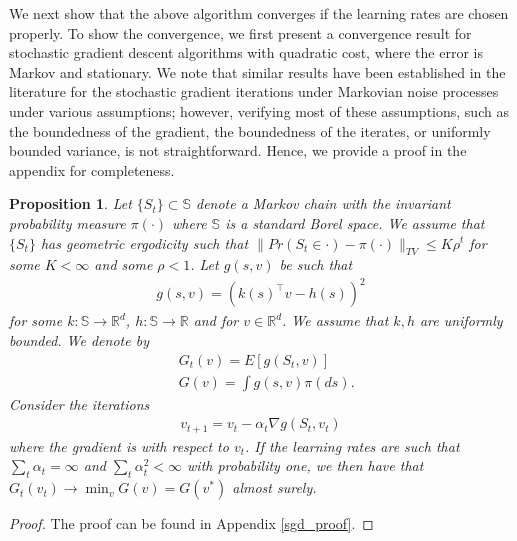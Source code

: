 \documentclass[twoside,11pt]{article}
\newtheorem{prop}{Proposition}[section]
\begin{document}
We next show that the above algorithm converges if the learning rates are chosen properly. To show the convergence, we first present a convergence result for stochastic gradient descent algorithms with quadratic cost, where the error is Markov and stationary.  We note that similar results have been established in the literature for the stochastic gradient iterations under Markovian noise processes under various assumptions; however, verifying most of these assumptions, such as the boundedness of the gradient, the boundedness of the iterates, or uniformly bounded variance, is not straightforward. Hence, we provide a proof in the appendix for completeness.
\begin{prop}\label{sgd} 
Let $\{S_t\} \subset \mathds{S}$ denote a Markov chain with the invariant probability measure $\pi(\cdot)$ where $\mathds{S}$ is a standard Borel space.  We assume that $\{S_t\}$ has geometric ergodicity such that $\|Pr(S_t\in\cdot) - \pi(\cdot)\|_{TV}\leq K\rho^t$ for some $K<\infty$ and some $\rho<1$.  Let $g(s,v)$ be  such that 
\begin{align*}
g(s,v) = \left( k(s)^\intercal v - h(s)  \right)^2
\end{align*}
for some $k:\mathds{S}\to \mathds{R}^d$, $h:\mathds{S}\to \mathds{R}$  and for $v\in\mathds{R}^d$. We assume that $k,h$ are uniformly bounded.  We denote by 
\begin{align*}
&G_t(v)= E[g(S_t,v)]\\
&G(v) = \int g(s,v) \pi(ds).
\end{align*}
Consider the iterations
\begin{align*}
v_{t+1} = v_t - \alpha_t \nabla g(S_t,v_t)
\end{align*}
where the gradient is with respect to $v_t$. If the learning rates are such that $\sum_t\alpha_t=\infty$ and $\sum_t\alpha_t^2<\infty$ with probability one,  we then have that $G_t(v_t) \to \min_vG(v) = G(v^*)$ almost surely.
\end{prop}
\begin{proof}
The proof can be found in Appendix \ref{sgd_proof}.
\end{proof}
\end{document}
